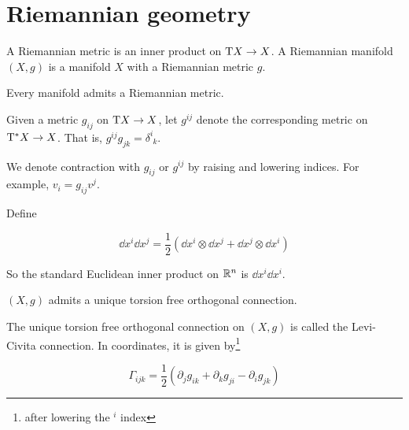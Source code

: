 \section{Riemannian geometry}

\begin{definition}
     A Riemannian metric is an inner product on \(\mathrm{T} X \to X\). A Riemannian manifold \((X, g)\) is a manifold \(X\) with a Riemannian metric \(g\).
\end{definition}

\begin{lemma}
    Every manifold admits a Riemannian metric.
\end{lemma}

\begin{definition}

    Given a metric \(g_{ij}\) on \(\mathrm{T} X \to X\), let \(g^{ij}\) denote the corresponding metric on \(\mathrm{T}^* X \to X\). That is, \(g^{ij}g_{jk} = \delta^i_{\phantom{i}k}\).
\end{definition}

\begin{definition}

    We denote contraction with \(g_{ij}\) or \(g^{ij}\) by raising and lowering indices. For example, \(v_i = g_{ij}v^j\).
\end{definition}

\begin{notation}
     Define

    \[\dd x^i\dd x^j = \frac{1}{2}\left(\dd x^i \otimes \dd x^j + \dd x^j \otimes \dd x^i\right)\]

    So the standard Euclidean inner product on \(\mathbb{R}^n\) is \(\dd x^i\dd x^i\).
\end{notation}

\begin{theorem}
     \((X, g)\) admits a unique torsion free orthogonal connection.
\end{theorem}

\begin{definition}
     The unique torsion free orthogonal connection on \((X, g)\) is called the Levi-Civita connection. In coordinates, it is given by\footnote{after lowering the \({}^i\) index}

    \[\Gamma_{ijk} = \frac{1}{2}\left(\partial_jg_{ik} + \partial_kg_{ji} - \partial_i g_{jk}\right)\]
\end{definition}

